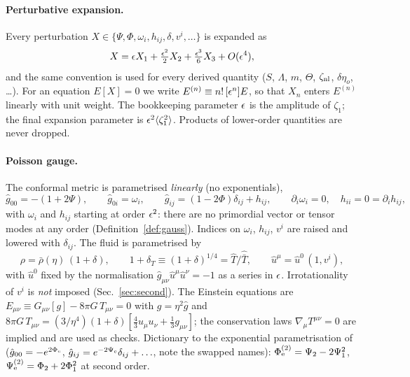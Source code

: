 \paragraph{Perturbative expansion.}
Every perturbation $X\in\{\Psi,\Phi,\omega_i,h_{ij},\delta,v^i,\ldots\}$ is expanded as
\begin{equation}
X=\epsilon X_1+\tfrac{\epsilon^2}{2}X_2+\tfrac{\epsilon^3}{6}X_3+O(\epsilon^4),
\label{eq:expansion}
\end{equation}
and the same convention is used for every derived quantity ($S$, $\Lambda$, $m$, $\Theta$, $\zeta_{\rm nl}$, $\delta\eta_o$, \ldots).
For an equation $E[X]=0$ we write $E^{(n)}\equiv n!\,[\epsilon^n]E$, so that $X_n$ enters $E^{(n)}$ linearly with
unit weight.  The bookkeeping parameter $\epsilon$ is the amplitude of $\zeta_1$; the final expansion
parameter is $\epsilon^2\langle\zeta_1^2\rangle$.  Products of lower-order quantities are never dropped.

\paragraph{Poisson gauge.}
The conformal metric is parametrised \emph{linearly} (no exponentials),
\begin{equation}
\hat g_{00}=-(1+2\Psi),\qquad \hat g_{0i}=\omega_i,\qquad \hat g_{ij}=(1-2\Phi)\delta_{ij}+h_{ij},
\qquad \partial_i\omega_i=0,\quad h_{ii}=0=\partial_ih_{ij},
\label{eq:poisson}
\end{equation}
with $\omega_i$ and $h_{ij}$ starting at order $\epsilon^2$: there are no primordial vector or tensor modes at any order
(Definition~\ref{def:gauss}).  Indices on $\omega_i$, $h_{ij}$, $v^i$ are raised and lowered with $\delta_{ij}$.
The fluid is parametrised by
\begin{equation}
\rho=\bar\rho(\eta)\,(1+\delta),\qquad 1+\delta_T\equiv(1+\delta)^{1/4}=\hat T/\hat{\bar T},\qquad
\hat u^\mu=\hat u^0\,(1,v^i),
\label{eq:fluidvars}
\end{equation}
with $\hat u^0$ fixed by the normalisation $\hat g_{\mu\nu}\hat u^\mu\hat u^\nu=-1$ as a series in $\epsilon$.
Irrotationality of $v^i$ is \emph{not} imposed (Sec.~\ref{sec:second}).  The Einstein equations are
$E_{\mu\nu}\equiv G_{\mu\nu}[g]-8\pi G\,T_{\mu\nu}=0$ with $g=\eta^2\hat g$ and
$8\pi G\,T_{\mu\nu}=(3/\eta^4)(1+\delta)[\tfrac43u_\mu u_\nu+\tfrac13g_{\mu\nu}]$; the conservation laws
$\nabla_\mu T^{\mu\nu}=0$ are implied and are used as checks.
Dictionary to the exponential parametrisation of \cite{BMR1,BMR2,MZ}
($\hat g_{00}=-e^{2\Phi_{\rm e}}$, $\hat g_{ij}=e^{-2\Psi_{\rm e}}\delta_{ij}+\ldots$, note the swapped names):
$\Phi_{\rm e}^{(2)}=\Psi_2-2\Psi_1^2$, $\Psi_{\rm e}^{(2)}=\Phi_2+2\Phi_1^2$ at second order.

